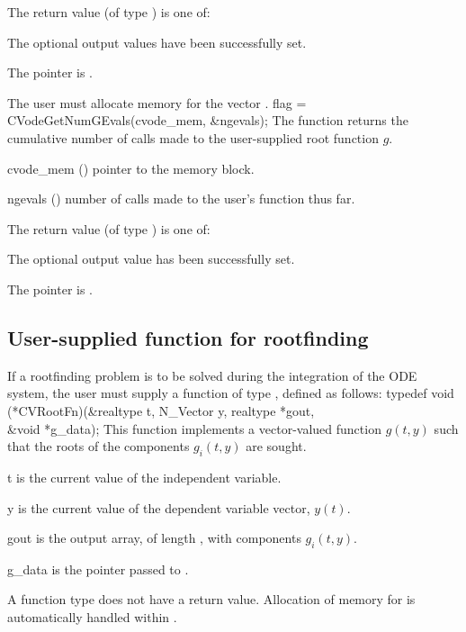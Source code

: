 {
  The return value  (of type ) is one of:
  \begin{args}
  \item[\Id{CV\_SUCCESS}] 
    The optional output values have been successfully set.
  \item[\Id{CV\_MEM\_NULL}]
    The  pointer is .
  \end{args}
}
{
  {\warn}The user must allocate memory for the vector .  
}
{
  flag = CVodeGetNumGEvals(cvode\_mem, \&ngevals);
}
{
  The function  returns the cumulative
  number of calls made to the user-supplied root function $g$.
}
{
  \begin{args}
  \item[cvode\_mem] ()
    pointer to the {\cvodes} memory block.
  \item[ngevals] ()
    number of calls made to the user's function  thus far.
  \end{args}
}
{
  The return value  (of type ) is one of:
  \begin{args}
  \item[\Id{CV\_SUCCESS}] 
    The optional output value has been successfully set.
  \item[\Id{CV\_MEM\_NULL}]
    The  pointer is .
  \end{args}
}
{}

\subsection{User-supplied function for rootfinding}\label{ss:root_us}

If a rootfinding problem is to be solved during the integration of the ODE system,
the user must supply a {\C} function of type , defined as follows:
{
  typedef void (*CVRootFn)(&realtype t, N\_Vector y, realtype *gout, \\
                           &void *g\_data);
}
{
  This function implements a vector-valued function $g(t,y)$ such that the roots of 
  the  components $g_i(t,y)$ are sought.
}
{
  \begin{args}[g\_data]
  \item[t]
    is the current value of the independent variable.
  \item[y]
    is the current value of the dependent variable vector, $y(t)$.
  \item[gout]
    is the output array, of length , with components $g_i(t,y)$.
  \item[g\_data]
    is the       
    pointer passed to .   
  \end{args}
}
{
  A  function type does not have a return value.                        
}
{
  Allocation of memory for  is automatically handled within {\cvodes}.
}

